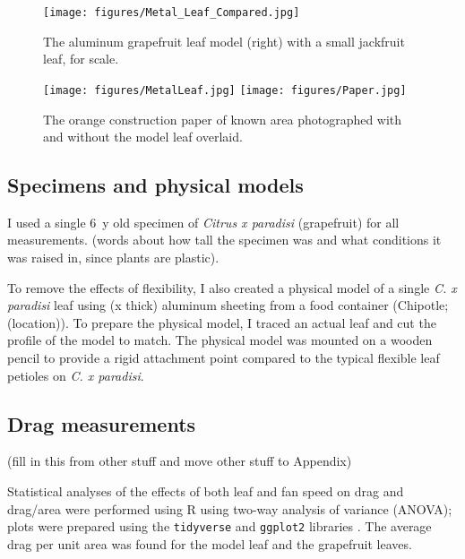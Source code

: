 \begin{figure}
\begin{center}
\texttt{[image: figures/Metal\_Leaf\_Compared.jpg]}
\end{center}
\caption{The aluminum grapefruit leaf model (right) with a small jackfruit leaf, for scale.}
\label{fig:methods3}
\end{figure}

\begin{figure}
\begin{center}
\texttt{[image: figures/MetalLeaf.jpg]}
\texttt{[image: figures/Paper.jpg]}
\end{center}
\caption{The orange construction paper of known area photographed with and without the model leaf overlaid.}
\label{fig:methods4}
\end{figure}

\subsection{Specimens and physical models}
I used a single \SI{6}{y} old specimen of \emph{Citrus x paradisi} (grapefruit) for all measurements. (words about how tall the specimen was and what conditions it was raised in, since plants are plastic). 

To remove the effects of flexibility, I also created a physical model of a single \emph{C. x paradisi} leaf using (x thick) aluminum sheeting from a food container (Chipotle; (location)). To prepare the physical model, I traced an actual leaf and cut the profile of the model to match. The physical model was mounted on a wooden pencil to provide a rigid attachment point compared to the typical flexible leaf petioles on \emph{C. x paradisi}. 

\subsection{Drag measurements}
(fill in this from other stuff and move other stuff to Appendix)


Statistical analyses of the effects of both leaf and fan speed on drag and drag/area were performed using R \citep{r2020} using two-way analysis of variance (ANOVA); plots were prepared using the \lstinline{tidyverse} and \lstinline{ggplot2} libraries \citep{wickham2019tidyverse}. The average drag per unit area was found for the model leaf and the grapefruit leaves.

